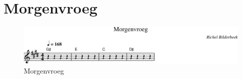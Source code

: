 \chapter{Morgenvroeg}



\begin{figure}[!htbp]
  \includegraphics[width=\textwidth,height=\textheight,keepaspectratio]{../songs/26_morgenvroeg.png}
  \caption{Morgenvroeg}
  \label{fig:26_morgenvroeg}
\end{figure}

